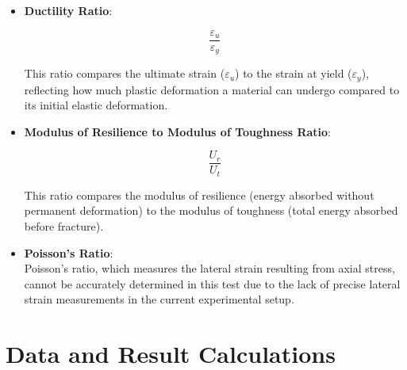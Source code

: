 \documentclass{article}
\begin{document}
\begin{itemize}
\item \textbf{Ductility Ratio}:\\[8pt]
\begin{minipage}{0.3\textwidth}
    \begin{equation}
        \frac{\varepsilon_u}{\varepsilon_y}
    \end{equation}
\end{minipage}\hfill
\begin{minipage}{0.6\textwidth}
    This ratio compares the ultimate strain (\(\varepsilon_u\)) to the strain at yield (\(\varepsilon_y\)), reflecting how much plastic deformation a material can undergo compared to its initial elastic deformation.
\end{minipage}

\item \textbf{Modulus of Resilience to Modulus of Toughness Ratio}:\\[8pt]
\begin{minipage}{0.3\textwidth}
    \begin{equation}
        \frac{U_r}{U_t}
    \end{equation}
\end{minipage}\hfill
\begin{minipage}{0.6\textwidth}
    This ratio compares the modulus of resilience (energy absorbed without permanent deformation) to the modulus of toughness (total energy absorbed before fracture).
\end{minipage}

\item \textbf{Poisson's Ratio}:\\[8pt]
Poisson's ratio, which measures the lateral strain resulting from axial stress, cannot be accurately determined in this test due to the lack of precise lateral strain measurements in the current experimental setup.

\end{itemize}

        
    \newpage\vspace*{-20pt}
    
    \section{Data and Result Calculations}
    
\end{document}
